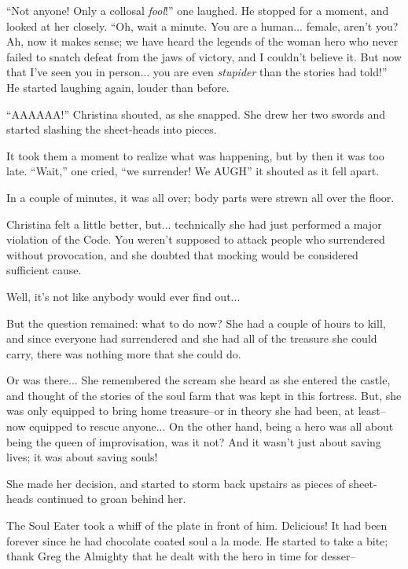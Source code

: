 \documentclass[showtrims,b6paper,draft,10pt]{memoir}
\begin{document}
``Not anyone!  Only a collosal \emph{fool}!''  one laughed.  He stopped for a moment, and looked at her closely.  ``Oh, wait a minute.  You are a human... female, aren't you?  Ah, now it makes sense;  we have heard the legends of the woman hero who never failed to snatch defeat from the jaws of victory, and I couldn't believe it.  But now that I've seen you in person... you are even \emph{stupider} than the stories had told!''  He started laughing again, louder than before.

``AAAAAA!'' Christina shouted, as she snapped.  She drew her two swords and started slashing the sheet-heads into pieces.

It took them a moment to realize what was happening, but by then it was too late.  ``Wait,'' one cried, ``we surrender!  We AUGH'' it shouted as it fell apart.

In a couple of minutes, it was all over;  body parts were strewn all over the floor.

Christina felt a little better, but... technically she had just performed a major violation of the Code.  You weren't supposed to attack people who surrendered without provocation, and she doubted that mocking would be considered sufficient cause.

Well, it's not like anybody would ever find out...

But the question remained:  what to do now?  She had a couple of hours to kill, and since everyone had surrendered and she had all of the treasure she could carry, there was nothing more that she could do.

Or was there...  She remembered the scream she heard as she entered the castle, and thought of the stories of the soul farm that was kept in this fortress.  But, she was only equipped to bring home treasure--or in theory she had been, at least--now equipped to rescue anyone... On the other hand, being a hero was all about being the queen of improvisation, was it not?  And it wasn't just about saving lives;  it was about saving souls!

She made her decision, and started to storm back upstairs as pieces of sheet-heads continued to groan behind her.

\timeskip
The Soul Eater took a whiff of the plate in front of him.  Delicious!  It had been forever since he had chocolate coated soul a la mode.  He started to take a bite;  thank Greg the Almighty that he dealt with the hero in time for desser--
\end{document}
